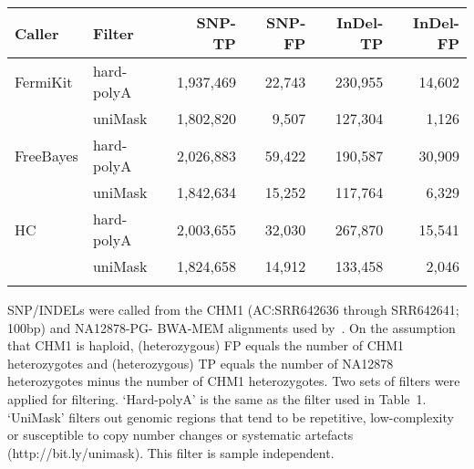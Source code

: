 \documentclass{bioinfo}
\begin{document}
\begin{table}[t]
{\footnotesize
\begin{tabular}{llrrrr}
\toprule
Caller   & Filter     & SNP-TP    & SNP-FP & InDel-TP & InDel-FP \\
\midrule
FermiKit & hard-polyA & 1,937,469 & 22,743 & 230,955 & 14,602 \\
         & uniMask    & 1,802,820 & 9,507  & 127,304 & 1,126 \\
FreeBayes& hard-polyA & 2,026,883 & 59,422 & 190,587 & 30,909 \\
         & uniMask    & 1,842,634 & 15,252 & 117,764 & 6,329 \\
HC       & hard-polyA & 2,003,655 & 32,030 & 267,870 & 15,541 \\
         & uniMask    & 1,824,658 & 14,912 & 133,458 & 2,046 \\
\botrule
\end{tabular}}{SNP/INDELs were called from the CHM1 (AC:SRR642636 through SRR642641; 100bp) and NA12878-PG- BWA-MEM
alignments used by~\citet{Li:2014aa}. On the assumption that CHM1 is haploid,
(heterozygous) FP equals the number of CHM1 heterozygotes and (heterozygous) TP
equals the number of NA12878 heterozygotes minus the number of CHM1
heterozygotes. Two sets of filters were applied for filtering. `Hard-polyA' is
the same as the filter used in Table~1.  `UniMask' filters out genomic regions
that tend to be repetitive, low-complexity or susceptible to copy number
changes or systematic artefacts (http://bit.ly/unimask). This filter is
sample independent.}
\end{table}
\end{document}
